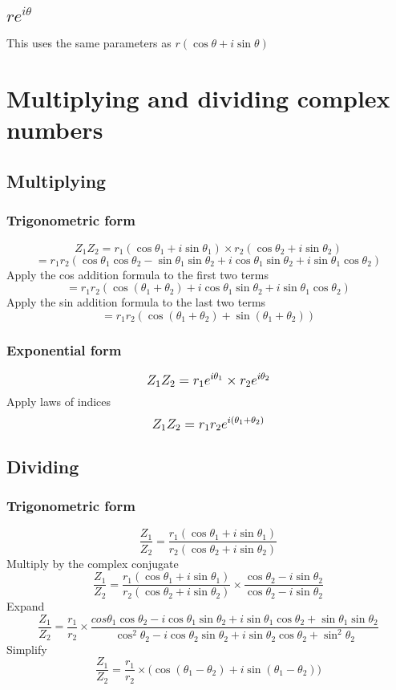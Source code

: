 \documentclass{article}[18pt]
\begin{document}
\subsection{$re^{i\theta}$}
This uses the same parameters as $r(\cos\theta+i\sin\theta)$
\newpage
\section{Multiplying and dividing complex numbers}
\subsection{Multiplying}
\subsubsection{Trigonometric form}
$$Z_1Z_2=r_1(\cos\theta_1+i\sin\theta_1)\times r_2(\cos\theta_2+i\sin\theta_2)$$
$$=r_1r_2(\cos\theta_1\cos\theta_2-\sin\theta_1\sin\theta_2+i\cos\theta_1\sin\theta_2+i\sin\theta_1\cos\theta_2)$$
Apply the cos addition formula to the first two terms
$$=r_1r_2(\cos(\theta_1+\theta_2)+i\cos\theta_1\sin\theta_2+i\sin\theta_1\cos\theta_2)$$
Apply the sin addition formula to the last two terms
$$=r_1r_2(\cos(\theta_1+\theta_2)+\sin(\theta_1+\theta_2))$$
\subsubsection{Exponential form}
$$\mathlarger{Z_1Z_2=r_1e^{i\theta_1}\times r_2e^{i\theta_2}}$$
Apply laws of indices 
$$\mathlarger{Z_1Z_2=r_1r_2e^{i(\theta_1+\theta_2)}}$$
\subsection{Dividing}
\subsubsection{Trigonometric form}
$$\frac{Z_1}{Z_2}=\frac{r_1(\cos\theta_1+i\sin\theta_1)}{r_2(\cos\theta_2+i\sin\theta_2)}$$
Multiply by the complex conjugate 
$$\frac{Z_1}{Z_2}=\frac{r_1(\cos\theta_1+i\sin\theta_1)}{r_2(\cos\theta_2+i\sin\theta_2)}\times\frac{\cos\theta_2-i\sin\theta_2}{\cos\theta_2-i\sin\theta_2}$$
Expand
$$\frac{Z_1}{Z_2}=\frac{r_1}{r_2}\times\frac{cos\theta_1\cos\theta_2-i\cos\theta_1\sin\theta_2+i\sin\theta_1\cos\theta_2+\sin\theta_1\sin\theta_2}{\cos^2\theta_2-i\cos\theta_2\sin\theta_2+i\sin\theta_2\cos\theta_2+\sin^2\theta_2}$$
Simplify
$$\frac{Z_1}{Z_2}=\frac{r_1}{r_2}\times\Big(\cos(\theta_1-\theta_2)+i\sin(\theta_1-\theta_2)\Big)$$
\end{document}

